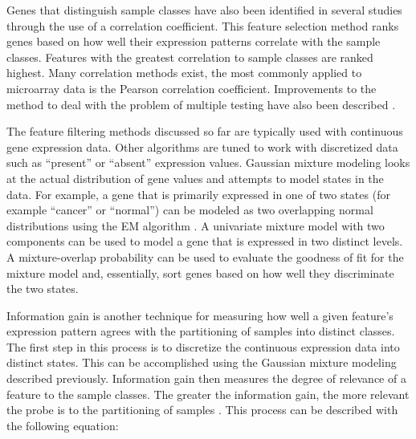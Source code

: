 
Genes that distinguish sample classes have also been identified in several
studies through the use of a correlation coefficient.  This feature selection
method ranks genes based on how well their expression patterns correlate with
the sample classes.  Features with the greatest correlation to sample classes
are ranked highest.  Many correlation methods exist, the most commonly applied
to microarray data is the Pearson correlation coefficient. Improvements to the
method to deal with the problem of multiple testing have also been described
\cite{dudoit2002smi}.






The feature filtering methods discussed so far are typically used with
continuous gene expression data.  Other algorithms are tuned to work with
discretized data such as ``present'' or ``absent'' expression values. Gaussian
mixture modeling looks at the actual distribution of gene values and attempts
to model states in the data.  For example, a gene that is primarily expressed
in one of two states (for example ``cancer'' or ``normal'') can be modeled as
two overlapping normal distributions using the EM algorithm
\cite{dempster1977mli}.  A univariate mixture model with two components can be
used to model a gene that is expressed in two distinct levels.  A
mixture-overlap probability can be used to evaluate the goodness of fit for the
mixture model and, essentially, sort genes based on how well they discriminate
the two states.



Information gain is another technique for measuring how well a given feature's
expression pattern agrees with the partitioning of samples into distinct
classes. The first step in this process is to discretize the continuous
expression data into distinct states.  This can be accomplished using the
Gaussian mixture modeling described previously.  Information gain then measures
the degree of relevance of a feature to the sample classes.  The greater the
information gain, the more relevant the probe is to the partitioning of samples
\cite{cover1991eit}. This process can be described with the following equation:

